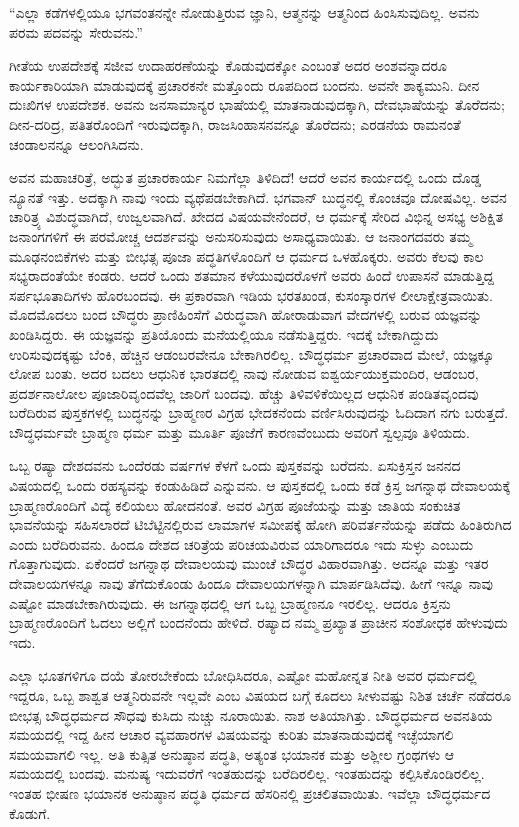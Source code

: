 “ಎಲ್ಲಾ ಕಡೆಗಳಲ್ಲಿಯೂ ಭಗವಂತನನ್ನೇ ನೋಡುತ್ತಿರುವ ಜ್ಞಾನಿ, ಆತ್ಮನನ್ನು ಆತ್ಮನಿಂದ ಹಿಂಸಿಸುವುದಿಲ್ಲ. ಅವನು ಪರಮ ಪದವನ್ನು ಸೇರುವನು.”

ಗೀತೆಯ ಉಪದೇಶಕ್ಕೆ ಸಜೀವ ಉದಾಹರಣೆಯನ್ನು ಕೊಡುವುದಕ್ಕೋ ಎಂಬಂತೆ ಅದರ ಅಂಶವನ್ನಾದರೂ ಕಾರ್ಯಕಾರಿಯಾಗಿ ಮಾಡುವುದಕ್ಕೆ ಪ್ರಚಾರಕನೇ ಮತ್ತೊಂದು ರೂಪದಿಂದ ಬಂದನು. ಅವನೇ ಶಾಕ್ಯಮುನಿ. ದೀನ ದುಃಖಿಗಳ ಉಪದೇಶಕ. ಅವನು ಜನಸಾಮಾನ್ಯರ ಭಾಷೆಯಲ್ಲಿ ಮಾತನಾಡುವುದಕ್ಕಾಗಿ, ದೇವಭಾಷೆಯನ್ನು ತೊರೆದನು; ದೀನ-ದರಿದ್ರ, ಪತಿತರೊಂದಿಗೆ ಇರುವುದಕ್ಕಾಗಿ, ರಾಜಸಿಂಹಾಸನವನ್ನೂ ತೊರೆದನು; ಎರಡನೆಯ ರಾಮನಂತೆ ಚಂಡಾಲನನ್ನೂ ಆಲಂಗಿಸಿದನು.

ಅವನ ಮಹಾಚರಿತ್ರೆ, ಅದ್ಭುತ ಪ್ರಚಾರಕಾರ್ಯ ನಿಮಗೆಲ್ಲಾ ತಿಳಿದಿದೆ! ಆದರೆ ಅವನ ಕಾರ್ಯದಲ್ಲಿ ಒಂದು ದೊಡ್ಡ ನ್ಯೂನತೆ ಇತ್ತು. ಅದಕ್ಕಾಗಿ ನಾವು ಇಂದು ವ್ಯಥೆಪಡಬೇಕಾಗಿದೆ. ಭಗವಾನ್​ ಬುದ್ಧನಲ್ಲಿ ಕೊಂಚವೂ ದೋಷವಿಲ್ಲ. ಅವನ ಚಾರಿತ್ರ್ಯ ವಿಶುದ್ಧವಾಗಿದೆ, ಉಜ್ವಲವಾಗಿದೆ. ಖೇದದ ವಿಷಯವೇನೆಂದರೆ, ಆ ಧರ್ಮಕ್ಕೆ ಸೇರಿದ ವಿಭಿನ್ನ ಅಸಭ್ಯ ಅಶಿಕ್ಷಿತ ಜನಾಂಗಗಳಿಗೆ ಈ ಪರಮೋಚ್ಚ ಆದರ್ಶವನ್ನು ಅನುಸರಿಸುವುದು ಅಸಾಧ್ಯವಾಯಿತು. ಆ ಜನಾಂಗದವರು ತಮ್ಮ ಮೂಢನಂಬಿಕೆಗಳು ಮತ್ತು ಬೀಭತ್ಸ ಪೂಜಾ ಪದ್ಧತಿಗಳೊಂದಿಗೆ ಆ ಧರ್ಮದ ಒಳಹೊಕ್ಕರು. ಅವರು ಕೆಲವು ಕಾಲ ಸಭ್ಯರಾದಂತೆಯೇ ಕಂಡರು. ಆದರೆ ಒಂದು ಶತಮಾನ ಕಳೆಯುವುದರೊಳಗೆ ಅವರು ಹಿಂದೆ ಉಪಾಸನೆ ಮಾಡುತ್ತಿದ್ದ ಸರ್ಪಭೂತಾದಿಗಳು ಹೊರಬಂದವು. ಈ ಪ್ರಕಾರವಾಗಿ ಇಡಿಯ ಭರತಖಂಡ, ಕುಸಂಸ್ಕಾರಗಳ ಲೀಲಾಕ್ಷೇತ್ರವಾಯಿತು. ಮೊದಮೊದಲು ಬಂದ ಬೌದ್ಧರು ಪ್ರಾಣಿಹಿಂಸೆಗೆ ವಿರುದ್ಧವಾಗಿ ಹೋರಾಡುವಾಗ ವೇದಗಳಲ್ಲಿ ಬರುವ ಯಜ್ಞವನ್ನು ಖಂಡಿಸಿದ್ದರು. ಈ ಯಜ್ಞವನ್ನು ಪ್ರತಿಯೊಂದು ಮನೆಯಲ್ಲಿಯೂ ನಡೆಸುತ್ತಿದ್ದರು. ಇದಕ್ಕೆ ಬೇಕಾಗಿದ್ದುದು ಉರಿಸುವುದಕ್ಕಷ್ಟು ಬೆಂಕಿ, ಹೆಚ್ಚಿನ ಆಡಂಬರವೇನೂ ಬೇಕಾಗಿರಲಿಲ್ಲ. ಬೌದ್ಧಧರ್ಮ ಪ್ರಚಾರವಾದ ಮೇಲೆ, ಯಜ್ಞಕ್ಕೂ ಲೋಪ ಬಂತು. ಅದರ ಬದಲು ಆಧುನಿಕ ಭಾರತದಲ್ಲಿ ನಾವು ನೋಡುವ ಐಶ್ವರ್ಯಯುಕ್ತಮಂದಿರ, ಆಡಂಬರ, ಪ್ರದರ್ಶನಾಲೋಲ ಪೂಜಾರಿವೃಂದವೆಲ್ಲ ಜಾರಿಗೆ ಬಂದವು. ಹೆಚ್ಚು ತಿಳಿವಳಿಕೆಯಿಲ್ಲದ ಆಧುನಿಕ ಪಂಡಿತವೃಂದವು ಬರೆದಿರುವ ಪುಸ್ತಕಗಳಲ್ಲಿ ಬುದ್ಧನನ್ನು ಬ್ರಾಹ್ಮಣರ ವಿಗ್ರಹ ಭೇದಕನೆಂದು ವರ್ಣಿಸಿರುವುದನ್ನು ಓದಿದಾಗ ನಗು ಬರುತ್ತದೆ. ಬೌದ್ಧಧರ್ಮವೇ ಬ್ರಾಹ್ಮಣ ಧರ್ಮ ಮತ್ತು ಮೂರ್ತಿ ಪೂಜೆಗೆ ಕಾರಣವೆಂಬುದು ಅವರಿಗೆ ಸ್ವಲ್ಪವೂ ತಿಳಿಯದು.

ಒಬ್ಬ ರಷ್ಯಾ ದೇಶದವನು ಒಂದೆರಡು ವರ್ಷಗಳ ಕೆಳಗೆ ಒಂದು ಪುಸ್ತಕವನ್ನು ಬರೆದನು. ಏಸುಕ್ರಿಸ್ತನ ಜನನದ ವಿಷಯದಲ್ಲಿ ಒಂದು ರಹಸ್ಯವನ್ನು ಕಂಡುಹಿಡಿದೆ ಎನ್ನುವನು. ಆ ಪುಸ್ತಕದಲ್ಲಿ ಒಂದು ಕಡೆ ಕ್ರಿಸ್ತ ಜಗನ್ನಾಥ ದೇವಾಲಯಕ್ಕೆ ಬ್ರಾಹ್ಮಣರೊಂದಿಗೆ ವಿದ್ಯೆ ಕಲಿಯಲು ಹೋದನಂತೆ. ಅವರ ವಿಗ್ರಹ ಪೂಜೆಯನ್ನು ಮತ್ತು ಜಾತಿಯ ಸಂಕುಚಿತ ಭಾವನೆಯನ್ನು ಸಹಿಸಲಾರದೆ ಟಿಬೆಟ್ಟಿನಲ್ಲಿರುವ ಲಾಮಾಗಳ ಸಮೀಪಕ್ಕೆ ಹೋಗಿ ಪರಿವರ್ತನೆಯನ್ನು ಪಡೆದು ಹಿಂತಿರುಗಿದ ಎಂದು ಬರೆದಿರುವನು. ಹಿಂದೂ ದೇಶದ ಚರಿತ್ರೆಯ ಪರಿಚಯವಿರುವ ಯಾರಿಗಾದರೂ ಇದು ಸುಳ್ಳು ಎಂಬುದು ಗೊತ್ತಾಗುವುದು. ಏಕೆಂದರೆ ಜಗನ್ನಾಥ ದೇವಾಲಯವು ಮುಂಚೆ ಬೌದ್ಧರ ವಿಹಾರವಾಗಿತ್ತು. ಅದನ್ನೂ ಮತ್ತು ಇತರ ದೇವಾಲಯ\-ಗಳನ್ನೂ ನಾವು ತೆಗೆದುಕೊಂಡು ಹಿಂದೂ ದೇವಾಲಯಗಳನ್ನಾಗಿ ಮಾರ್ಪಡಿಸಿದೆವು. ಹೀಗೆ ಇನ್ನೂ ನಾವು ಎಷ್ಟೋ ಮಾಡಬೇಕಾಗಿರುವುದು. ಈ ಜಗನ್ನಾಥದಲ್ಲಿ ಆಗ ಒಬ್ಬ ಬ್ರಾಹ್ಮಣನೂ ಇರಲಿಲ್ಲ. ಆದರೂ ಕ್ರಿಸ್ತನು ಬ್ರಾಹ್ಮಣರೊಂದಿಗೆ ಓದಲು ಅಲ್ಲಿಗೆ ಬಂದನೆಂದು ಹೇಳಿದೆ. ರಷ್ಯಾದ ನಮ್ಮ ಪ್ರಖ್ಯಾತ ಪ್ರಾಚೀನ ಸಂಶೋಧಕ ಹೇಳುವುದು ಇದು.

ಎಲ್ಲಾ ಭೂತಗಳಿಗೂ ದಯೆ ತೋರಬೇಕೆಂದು ಬೋಧಿಸಿದರೂ, ಎಷ್ಟೋ ಮಹೋನ್ನತ ನೀತಿ ಅವರ ಧರ್ಮದಲ್ಲಿ ಇದ್ದರೂ, ಒಬ್ಬ ಶಾಶ್ವತ ಆತ್ಮನಿರುವನೇ ಇಲ್ಲವೇ ಎಂಬ ವಿಷಯದ ಬಗ್ಗೆ ಕೂದಲು ಸೀಳುವಷ್ಟು ನಿಶಿತ ಚರ್ಚೆ ನಡೆದರೂ ಬೀಭತ್ಸ ಬೌದ್ಧಧರ್ಮದ ಸೌಧವು ಕುಸಿದು ನುಚ್ಚು ನೂರಾಯಿತು. ನಾಶ ಅತಿಯಾಗಿತ್ತು. ಬೌದ್ಧಧರ್ಮದ ಅವನತಿಯ ಸಮಯದಲ್ಲಿ ಇದ್ದ ಹೀನ ಆಚಾರ ವ್ಯವಹಾರಗಳ ವಿಷಯವನ್ನು ಕುರಿತು ಮಾತನಾಡುವುದಕ್ಕೆ ಇಚ್ಛೆಯಾಗಲಿ ಸಮಯವಾಗಲಿ ಇಲ್ಲ. ಅತಿ ಕುತ್ಸಿತ ಅನುಷ್ಠಾನ ಪದ್ಧತಿ, ಅತ್ಯಂತ ಭಯಾನಕ ಮತ್ತು ಅಶ್ಲೀಲ ಗ್ರಂಥಗಳು ಆ ಸಮಯದಲ್ಲಿ ಬಂದವು. ಮನುಷ್ಯ ಇದುವರೆಗೆ ಇಂತಹುದನ್ನು ಬರೆದಿರಲಿಲ್ಲ. ಇಂತಹುದನ್ನು ಕಲ್ಪಿಸಿಕೊಂಡಿರಲಿಲ್ಲ. ಇಂತಹ ಭೀಷಣ ಭಯಾನಕ ಅನುಷ್ಠಾನ ಪದ್ಧತಿ ಧರ್ಮದ ಹೆಸರಿನಲ್ಲಿ ಪ್ರಚಲಿತವಾಯಿತು. ಇವೆಲ್ಲಾ ಬೌದ್ಧಧರ್ಮದ ಕೊಡುಗೆ.

